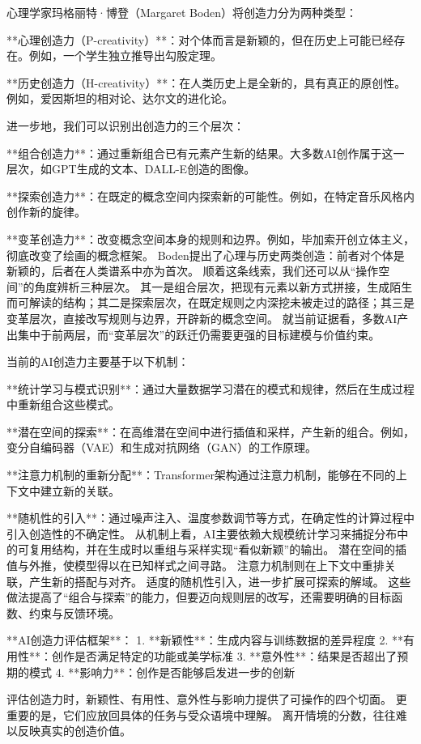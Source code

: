 心理学家玛格丽特·博登（Margaret Boden）将创造力分为两种类型：

**心理创造力（P-creativity）**：对个体而言是新颖的，但在历史上可能已经存在。例如，一个学生独立推导出勾股定理。

**历史创造力（H-creativity）**：在人类历史上是全新的，具有真正的原创性。例如，爱因斯坦的相对论、达尔文的进化论。

进一步地，我们可以识别出创造力的三个层次：

**组合创造力**：通过重新组合已有元素产生新的结果。大多数AI创作属于这一层次，如GPT生成的文本、DALL-E创造的图像。

**探索创造力**：在既定的概念空间内探索新的可能性。例如，在特定音乐风格内创作新的旋律。

**变革创造力**：改变概念空间本身的规则和边界。例如，毕加索开创立体主义，彻底改变了绘画的概念框架。
Boden提出了心理与历史两类创造：前者对个体是新颖的，后者在人类谱系中亦为首次。
顺着这条线索，我们还可以从“操作空间”的角度辨析三种层次。
其一是组合层次，把现有元素以新方式拼接，生成陌生而可解读的结构；其二是探索层次，在既定规则之内深挖未被走过的路径；其三是变革层次，直接改写规则与边界，开辟新的概念空间。
就当前证据看，多数AI产出集中于前两层，而“变革层次”的跃迁仍需要更强的目标建模与价值约束。

当前的AI创造力主要基于以下机制：

**统计学习与模式识别**：通过大量数据学习潜在的模式和规律，然后在生成过程中重新组合这些模式。

**潜在空间的探索**：在高维潜在空间中进行插值和采样，产生新的组合。例如，变分自编码器（VAE）和生成对抗网络（GAN）的工作原理。

**注意力机制的重新分配**：Transformer架构通过注意力机制，能够在不同的上下文中建立新的关联。

**随机性的引入**：通过噪声注入、温度参数调节等方式，在确定性的计算过程中引入创造性的不确定性。
从机制上看，AI主要依赖大规模统计学习来捕捉分布中的可复用结构，并在生成时以重组与采样实现“看似新颖”的输出。
潜在空间的插值与外推，使模型得以在已知样式之间寻路。
注意力机制则在上下文中重排关联，产生新的搭配与对齐。
适度的随机性引入，进一步扩展可探索的解域。
这些做法提高了“组合与探索”的能力，但要迈向规则层的改写，还需要明确的目标函数、约束与反馈环境。

\begin{center}
**AI创造力评估框架**：
1. **新颖性**：生成内容与训练数据的差异程度
2. **有用性**：创作是否满足特定的功能或美学标准
3. **意外性**：结果是否超出了预期的模式
4. **影响力**：创作是否能够启发进一步的创新
\end{center}
评估创造力时，新颖性、有用性、意外性与影响力提供了可操作的四个切面。
更重要的是，它们应放回具体的任务与受众语境中理解。
离开情境的分数，往往难以反映真实的创造价值。

